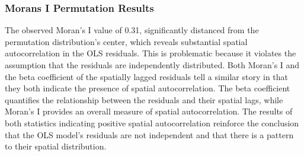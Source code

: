 \documentclass[
]{article}
\begin{document}
\hypertarget{morans-i-permutation-results}{%
\subsubsection{Morans I Permutation
Results}\label{morans-i-permutation-results}}

The observed Moran's I value of 0.31, significantly distanced from the
permutation distribution's center, which reveals substantial spatial
autocorrelation in the OLS residuals. This is problematic because it
violates the assumption that the residuals are independently
distributed. Both Moran's I and the beta coefficient of the spatially
lagged residuals tell a similar story in that they both indicate the
presence of spatial autocorrelation. The beta coefficient quantifies the
relationship between the residuals and their spatial lags, while Moran's
I provides an overall measure of spatial autocorrelation. The results of
both statistics indicating positive spatial autocorrelation reinforce
the conclusion that the OLS model's residuals are not independent and
that there is a pattern to their spatial distribution.
\end{document}
